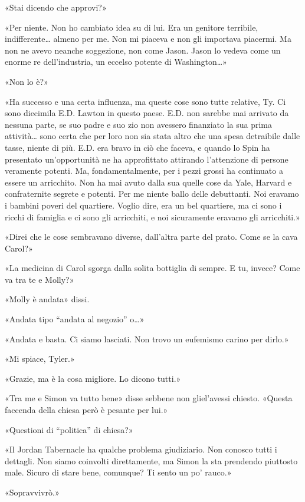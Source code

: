 «Stai dicendo che approvi?»

«Per niente. Non ho cambiato idea su di lui. Era un genitore terribile,
indifferente\ldots{} almeno per me. Non mi piaceva e non gli importava
piacermi. Ma non ne avevo neanche soggezione, non come Jason. Jason lo
vedeva come un enorme re dell'industria, un eccelso potente di
Washington\ldots»

«Non lo è?»

«Ha successo e una certa influenza, ma queste cose sono tutte relative,
Ty. Ci sono diecimila E.D. Lawton in questo paese. E.D. non sarebbe mai
arrivato da nessuna parte, se suo padre e suo zio non avessero
finanziato la sua prima attività\ldots{} sono certa che per loro non sia
stata altro che una spesa detraibile dalle tasse, niente di più. E.D.
era bravo in ciò che faceva, e quando lo Spin ha presentato
un'opportunità ne ha approfittato attirando l'attenzione di persone
veramente potenti. Ma, fondamentalmente, per i pezzi grossi ha
continuato a essere un arricchito. Non ha mai avuto dalla sua quelle
cose da Yale, Harvard e confraternite segrete e potenti. Per me niente
ballo delle debuttanti. Noi eravamo i bambini poveri del quartiere.
Voglio dire, era un bel quartiere, ma ci sono i ricchi di famiglia e ci
sono gli arricchiti, e noi sicuramente eravamo gli arricchiti.»

«Direi che le cose sembravano diverse, dall'altra parte del prato. Come
se la cava Carol?»

«La medicina di Carol sgorga dalla solita bottiglia di sempre. E tu,
invece? Come va tra te e Molly?»

«Molly è andata» dissi.

«Andata tipo ``andata al negozio'' o\ldots»

«Andata e basta. Ci siamo lasciati. Non trovo un eufemismo carino per
dirlo.»

«Mi spiace, Tyler.»

«Grazie, ma è la cosa migliore. Lo dicono tutti.»

«Tra me e Simon va tutto bene» disse sebbene non gliel'avessi chiesto.
«Questa faccenda della chiesa però è pesante per lui.»

«Questioni di ``politica'' di chiesa?»

«Il Jordan Tabernacle ha qualche problema giudiziario. Non conosco tutti
i dettagli. Non siamo coinvolti direttamente, ma Simon la sta prendendo
piuttosto male. Sicuro di stare bene, comunque? Ti sento un po' rauco.»

«Sopravvivrò.»

